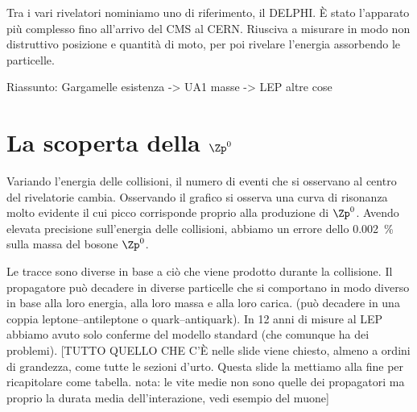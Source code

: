         Tra i vari rivelatori nominiamo uno di riferimento, il DELPHI. È stato l'apparato più complesso fino all'arrivo del CMS al CERN. Riusciva a misurare in modo non distruttivo posizione e quantità di moto, per poi rivelare l'energia assorbendo le particelle.
        
        Riassunto: Gargamelle esistenza -> UA1 masse -> LEP altre cose
    \section{La scoperta della $\Zp^0$}
        Variando l'energia delle collisioni, il numero di eventi che si osservano al centro del rivelatorie cambia. Osservando il grafico si osserva una curva di risonanza molto evidente il cui picco corrisponde proprio alla produzione di $\Zp^0$. Avendo elevata precisione sull'energia delle collisioni, abbiamo un errore dello \SI{0.002}{\%} sulla massa del bosone $\Zp^0$.
        
        Le tracce sono diverse in base a ciò che viene prodotto durante la collisione. Il propagatore può decadere in diverse particelle che si comportano in modo diverso in base alla loro energia, alla loro massa e alla loro carica. (può decadere in una coppia leptone--antileptone o quark--antiquark). In 12 anni di misure al LEP abbiamo avuto solo conferme del modello standard (che comunque ha dei problemi). [TUTTO QUELLO CHE C'È nelle slide viene chiesto, almeno a ordini di grandezza, come tutte le sezioni d'urto. Questa slide la mettiamo alla fine per ricapitolare come tabella. nota: le vite medie non sono quelle dei propagatori ma proprio la durata media dell'interazione, vedi esempio del muone]
        
